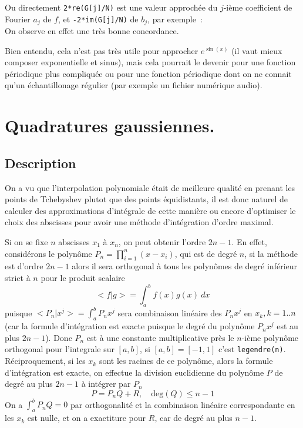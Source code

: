 \documentclass[a4paper,11pt]{book}
\begin{document}
\begin{giacjshere}
Ou directement \verb|2*re(G[j]/N)| est une valeur approch\'ee du
$j$-i\`eme coefficient de Fourier $a_j$ de $f$, et \verb|-2*im(G[j]/N)|
de $b_j$, par exemple~:\\
On observe en effet une tr\`es bonne concordance.

Bien entendu, cela n'est pas tr\`es utile pour approcher $e^{\sin(x)}$
(il vaut mieux composer exponentielle et sinus), 
mais cela pourrait le devenir pour une
fonction p\'eriodique plus compliqu\'ee ou pour une fonction
p\'eriodique dont on ne connait qu'un \'echantillonage r\'egulier
(par exemple un fichier num\'erique audio).

\section{Quadratures gaussiennes.}
\subsection{Description}
On a vu que l'interpolation polynomiale \'etait de meilleure
qualit\'e en prenant les points de Tchebyshev plutot que
des points \'equidistants, il est donc naturel de calculer
des approximations d'int\'egrale de cette mani\`ere
ou encore d'optimiser le choix des abscisses pour avoir
une m\'ethode d'int\'egration d'ordre maximal.

Si on se fixe $n$ abscisses $x_1$ \`a $x_n$, on peut obtenir l'ordre
$2n-1$. En effet, consid\'erons le polyn\^ome $P_n=\prod_{i=1}^n (x-x_i)$,
qui est de degr\'e $n$, si la m\'ethode est d'ordre $2n-1$ alors
il sera orthogonal \`a tous les polyn\^omes de degr\'e inf\'erieur
strict \`a $n$ pour le produit scalaire 
$$<f|g>=\int_a^b f(x) g(x) \ dx$$
puisque $<P_n|x^j>=\int_a^b P_n x^j $ sera combinaison lin\'eaire des
$P_n x^j$ en $x_k, k=1..n$ (car la formule d'int\'egration est exacte puisque le degr\'e
du polyn\^ome $P_nx^j$ est au plus $2n-1$). Donc $P_n$ est \`a une constante
multiplicative pr\`es le $n$-i\`eme polyn\^ome orthogonal pour
l'integrale sur $[a,b]$, si $[a,b]=[-1,1]$ c'est \verb|legendre(n)|.
R\'eciproquement, si les $x_k$ sont les racines de ce polyn\^ome,
alors la formule d'int\'egration est exacte, on effectue la division
euclidienne du polyn\^ome $P$ de degr\'e au plus $2n-1$ \`a
int\'egrer par $P_n$
$$ P= P_n Q + R , \quad \mbox{deg}(Q) \leq n-1 $$
On a $\int_a^b P_n Q=0$ par orthogonalit\'e et la combinaison
lin\'eaire correspondante en les $x_k$ est nulle, et on a exactiture
pour $R$, car de degr\'e au plus $n-1$.


\end{giacjshere}
\end{document}

